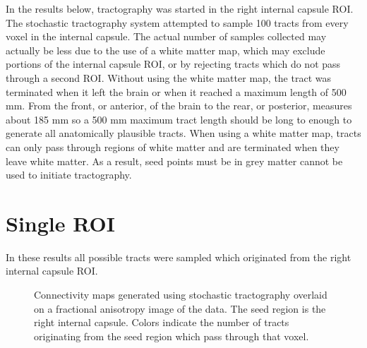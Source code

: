 In the results below, tractography was started in the right internal capsule ROI.  The stochastic tractography system attempted to sample 100 tracts from every voxel in the internal capsule.  The actual number of samples collected may actually be less due to the use of a white matter map, which may exclude portions of the internal capsule ROI, or by rejecting tracts which do not pass through a second ROI.  Without using the white matter map, the tract was terminated when it left the brain or when it reached a maximum length of 500 mm.  From the front, or anterior, of the brain to the rear, or posterior, measures about 185 mm so a 500 mm maximum tract length should be long to enough to generate all anatomically plausible tracts.  When using a white matter map, tracts can only pass through regions of white matter and are terminated when they leave white matter.  As a result, seed points must be in grey matter cannot be used to initiate tractography.

\section{Single ROI}
In these results all possible tracts were sampled which originated from the right internal capsule ROI.

\begin{figure} 
  \label{fig:singlecmaps}
	\caption{Connectivity maps generated using stochastic tractography overlaid on a fractional anisotropy image of the data.  The seed region is the right internal capsule.  Colors indicate the number of tracts originating from the seed region which pass through that voxel.}
\end{figure}

